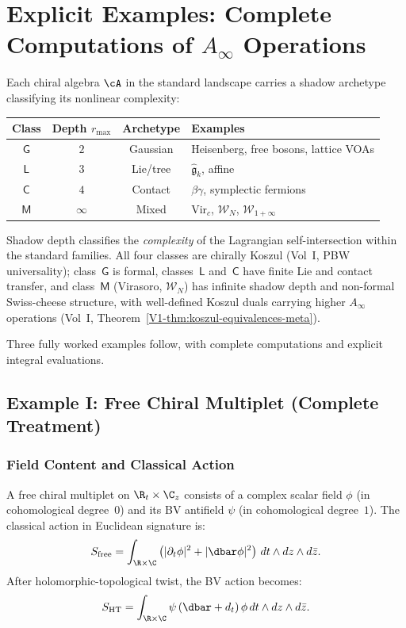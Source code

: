\section{Explicit Examples: Complete Computations of $A_\infty$ Operations}

\begin{construction}
Each chiral algebra $\cA$ in the standard landscape carries a shadow archetype classifying its nonlinear complexity:
\begin{center}
\begin{tabular}{cccl}
\toprule
Class & Depth $r_{\max}$ & Archetype & Examples \\
\midrule
$\mathsf{G}$ & $2$ & Gaussian & Heisenberg, free bosons, lattice VOAs \\
$\mathsf{L}$ & $3$ & Lie/tree & $\hat{\mathfrak{g}}_k$, affine \\
$\mathsf{C}$ & $4$ & Contact & $\beta\gamma$, symplectic fermions \\
$\mathsf{M}$ & $\infty$ & Mixed & $\mathrm{Vir}_c$, $\mathcal{W}_N$, $\mathcal{W}_{1+\infty}$ \\
\bottomrule
\end{tabular}
\end{center}
Shadow depth classifies the \emph{complexity} of the Lagrangian self-intersection within the standard families. All four classes are chirally Koszul (Vol~I, PBW universality); class~$\mathsf{G}$ is formal, classes~$\mathsf{L}$ and~$\mathsf{C}$ have finite Lie and contact transfer, and class~$\mathsf{M}$ (Virasoro, $\mathcal{W}_N$) has infinite shadow depth and non-formal Swiss-cheese structure, with well-defined Koszul duals carrying higher $A_\infty$ operations (Vol~I, Theorem~\ref*{V1-thm:koszul-equivalences-meta}).
\end{construction}

Three fully worked examples follow, with complete computations and explicit integral evaluations.
\subsection{Example I: Free Chiral Multiplet (Complete Treatment)}

\subsubsection{Field Content and Classical Action}
A free chiral multiplet on $\R_t \times \C_z$ consists of a complex scalar field $\phi$ (in cohomological degree~$0$) and its BV antifield $\psi$ (in cohomological degree~$1$). The classical action in Euclidean signature is:
\begin{equation}
S_{\text{free}} = \int_{\R \times \C} \left( |\partial_t \phi|^2 + |\dbar \phi|^2 \right) \, dt \wedge dz \wedge d\bar{z}.
\end{equation}
After holomorphic-topological twist, the BV action becomes:
\begin{equation}
S_{\text{HT}} = \int_{\R \times \C} \psi \,(\dbar + d_t)\, \phi \, dt \wedge dz \wedge d\bar{z}.
\end{equation}

